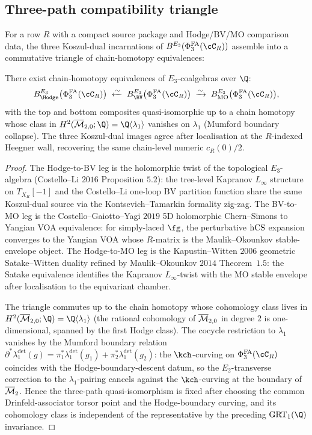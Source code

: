 \subsection{Three-path compatibility triangle}
\label{subsec:three-path-triangle}

For a row $R$ with a compact source package and Hodge/BV/MO comparison
data, the three Koszul-dual incarnations of
$B^{E_3}(\PhiFA_3(\cC_R))$ assemble into a commutative triangle of
chain-homotopy equivalences:

\begin{proposition}
\label{prop:three-path-triangle}
There exist chain-homotopy equivalences of $E_3$-coalgebras over $\Q$:
\[
 B^{E_3}_{\Hodge}\bigl(\PhiFA_3(\cC_R)\bigr)
 \;\xleftarrow{\sim}\;
 B^{E_3}_{\BV}\bigl(\PhiFA_3(\cC_R)\bigr)
 \;\xrightarrow{\sim}\;
 B^{E_3}_{\MO}\bigl(\PhiFA_3(\cC_R)\bigr),
\]
with the top and bottom composites quasi-isomorphic up to a chain
homotopy whose class in $H^2(\Mbar_{2, 0}; \Q) = \Q \langle
\lambda_1 \rangle$ vanishes on $\lambda_1$ (Mumford boundary collapse).
The three Koszul-dual images agree after localisation at the
$R$-indexed Heegner wall, recovering the same chain-level numeric
$c_R(0)/2$.
\end{proposition}

\begin{proof}
The Hodge-to-BV leg is the holomorphic twist of the topological $E_3$-
algebra (Costello--Li $2016$ Proposition $5.2$): the tree-level Kapranov
$L_\infty$ structure on $T_{X_R}[-1]$ and the Costello--Li one-loop BV
partition function share the same Koszul-dual source via the
Kontsevich--Tamarkin formality zig-zag. The BV-to-MO leg is the
Costello--Gaiotto--Yagi $2019$ 5D holomorphic Chern--Simons to Yangian
VOA equivalence: for simply-laced $\fg$, the perturbative $\mathrm{hCS}$
expansion converges to the Yangian VOA whose $R$-matrix is the
Maulik--Okounkov stable-envelope object. The Hodge-to-MO leg is the
Kapustin--Witten $2006$ geometric Satake--Witten duality refined by
Maulik--Okounkov $2014$ Theorem~$1.5$: the Satake equivalence identifies
the Kapranov $L_\infty$-twist with the MO stable envelope after
localisation to the equivariant chamber.

The triangle commutes up to the chain homotopy whose cohomology class
lives in $H^2(\Mbar_{2, 0}; \Q) = \Q\langle \lambda_1 \rangle$ (the
rational cohomology of $\overline{\mathcal{M}}_{2, 0}$ in degree $2$ is one-dimensional,
spanned by the first Hodge class). The cocycle restriction to
$\lambda_1$ vanishes by the Mumford boundary relation
$\partial^* \lambda_1^{\det}(g) =
\pi_1^* \lambda_1^{\det}(g_1) + \pi_2^*
\lambda_1^{\det}(g_2)$: the $\kch$-curving on $\PhiFA_3(\cC_R)$ coincides
with the Hodge-boundary-descent datum, so the $E_2$-transverse
correction to the $\lambda_1$-pairing cancels against the $\kch$-curving
at the boundary of $\overline{\mathcal{M}}_2$. Hence the three-path
quasi-isomorphism is fixed after choosing the common Drinfeld-associator
torsor point and the Hodge-boundary curving, and its cohomology class is
independent of the representative by the preceding $\GRTone(\Q)$
invariance.
\end{proof}

